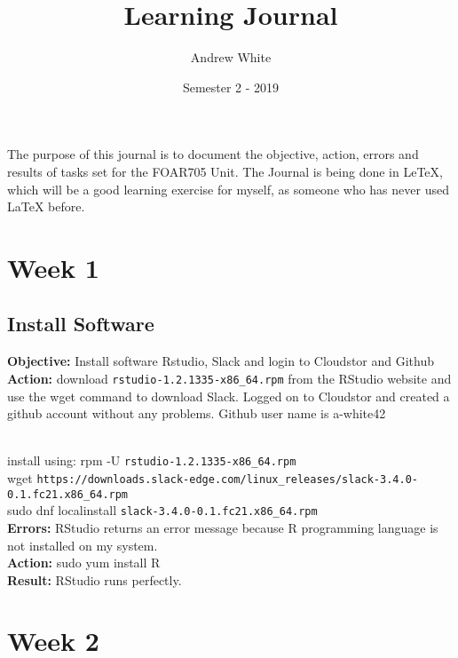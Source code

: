 \documentclass[a4paper,11pt]{article}
\title{Learning Journal}
\author{Andrew White}
\date{Semester 2 - 2019}
\begin{document}
\maketitle

\tableofcontents

\newpage

The purpose of this journal is to document the objective, action, errors and results of tasks set for the FOAR705 Unit. The Journal is being done in LeTeX, which will be a good learning exercise for myself, as someone who has never used LaTeX before. 

\section{Week 1}
\subsection{Install Software} 

\noindent \textbf{Objective:} Install software Rstudio, Slack and login to Cloudstor and Github \\

\noindent \textbf{Action:} download \verb|rstudio-1.2.1335-x86_64.rpm| from the RStudio website and use the wget command to download Slack. Logged on to Cloudstor and created a github account without any problems. Github user name is a-white42\\\

\noindent install using: rpm -U \verb|rstudio-1.2.1335-x86_64.rpm|\\

\noindent wget \verb|https://downloads.slack-edge.com/linux_releases/slack-3.4.0-0.1.fc21.x86_64.rpm|\\

\noindent sudo dnf localinstall \verb|slack-3.4.0-0.1.fc21.x86_64.rpm|\\

\noindent \textbf{Errors:} RStudio returns an error message because R programming language is not installed on my system.\\

\noindent \textbf{Action:} sudo yum install R\\

\noindent \textbf{Result:} RStudio runs perfectly. 

\section{Week 2}
\end{document}
